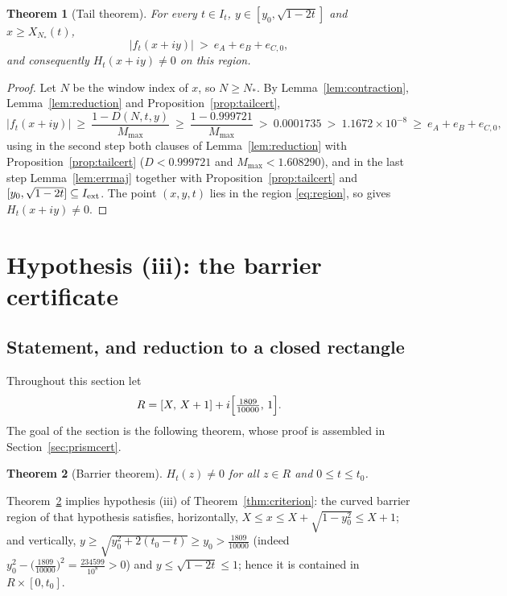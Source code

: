 \documentclass[11pt]{article}
\newtheorem{theorem}{Theorem}[section]
\theoremstyle{definition}
\begin{document}
\begin{theorem}[Tail theorem]\label{thm:tail}
For every $t\in I_t$, $y\in[y_0,\sqrt{1-2t}]$ and
$x\ge X_{N_*}(t)$,
\[
|f_t(x+iy)|\ >\ e_A+e_B+e_{C,0},
\]
and consequently $H_t(x+iy)\ne0$ on this region.
\end{theorem}

\begin{proof}
Let $N$ be the window index of $x$, so $N\ge N_*$. By
Lemma~\ref{lem:contraction}, Lemma~\ref{lem:reduction} and
Proposition~\ref{prop:tailcert},
\[
|f_t(x+iy)|\ \ge\ \frac{1-D(N,t,y)}{M_{\max}}
\ \ge\ \frac{1-0.999721}{M_{\max}}
\ >\ 0.0001735
\ >\ 1.1672\times10^{-8}
\ \ge\ e_A+e_B+e_{C,0},
\]
using in the second step both clauses of
Lemma~\ref{lem:reduction} with Proposition~\ref{prop:tailcert}
($D<0.999721$ and $M_{\max}<1.608290$), and in the last step
Lemma~\ref{lem:errmaj} together with
Proposition~\ref{prop:tailcert} and
$[y_0,\sqrt{1-2t}]\subseteq I_{\rm ext}$. The point $(x,y,t)$
lies in the region \eqref{eq:region}, so
\cite[Corollary~1.4]{Polymath} gives $H_t(x+iy)\neq0$.
\end{proof}

\section{Hypothesis (iii): the barrier certificate}\label{sec:barrier}

\subsection{Statement, and reduction to a closed rectangle}

Throughout this section let
\[
R=[X,\,X+1]+i\Bigl[\tfrac{1809}{10000},\,1\Bigr].
\]
The goal of the section is the following theorem, whose proof is
assembled in Section~\ref{sec:prismcert}.

\begin{theorem}[Barrier theorem]\label{thm:barrier}
$H_t(z)\ne0$ for all $z\in R$ and $0\le t\le t_0$.
\end{theorem}

Theorem~\ref{thm:barrier} implies hypothesis (iii) of
Theorem~\ref{thm:criterion}: the curved barrier region of that
hypothesis satisfies, horizontally,
$X\le x\le X+\sqrt{1-y_0^2}\le X+1$; and vertically,
$y\ge\sqrt{y_0^2+2(t_0-t)}\ge y_0>\frac{1809}{10000}$ (indeed
$y_0^2-\bigl(\frac{1809}{10000}\bigr)^2=\frac{234599}{10^8}>0$) and
$y\le\sqrt{1-2t}\le1$; hence it is contained in $R\times[0,t_0]$.
\end{document}
